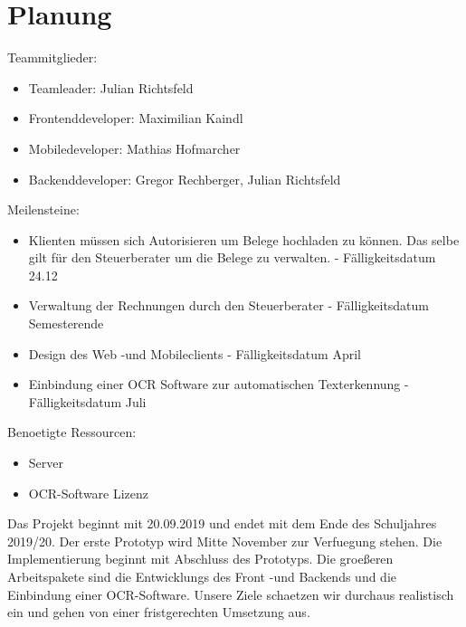 \documentclass[12pt]{article}
\theoremstyle{definition}
\begin{document}
\section{Planung}
Teammitglieder:
\begin{itemize}
\item Teamleader: Julian Richtsfeld
\item Frontenddeveloper: Maximilian Kaindl
\item Mobiledeveloper: Mathias Hofmarcher
\item Backenddeveloper: Gregor Rechberger, Julian Richtsfeld \hfill
\end{itemize}
Meilensteine:
\begin{itemize}
\item Klienten müssen sich Autorisieren um Belege hochladen zu können. Das selbe gilt für den Steuerberater um die Belege zu verwalten. - Fälligkeitsdatum 24.12
\item Verwaltung der Rechnungen durch den Steuerberater - Fälligkeitsdatum Semesterende
\item Design des Web -und Mobileclients - Fälligkeitsdatum April
\item Einbindung einer OCR Software zur automatischen Texterkennung - Fälligkeitsdatum Juli\hfill
\end{itemize}
Benoetigte Ressourcen:
\begin{itemize}
\item Server
\item OCR-Software Lizenz
\end{itemize}
Das Projekt beginnt mit 20.09.2019 und endet mit dem Ende des Schuljahres 2019/20. Der erste Prototyp wird Mitte November zur Verfuegung stehen. Die Implementierung beginnt mit Abschluss des Prototyps. Die groeßeren Arbeitspakete sind die Entwicklungs des Front -und Backends und die Einbindung einer OCR-Software. Unsere Ziele schaetzen wir durchaus realistisch ein und gehen von einer fristgerechten Umsetzung aus.
\end{document}
